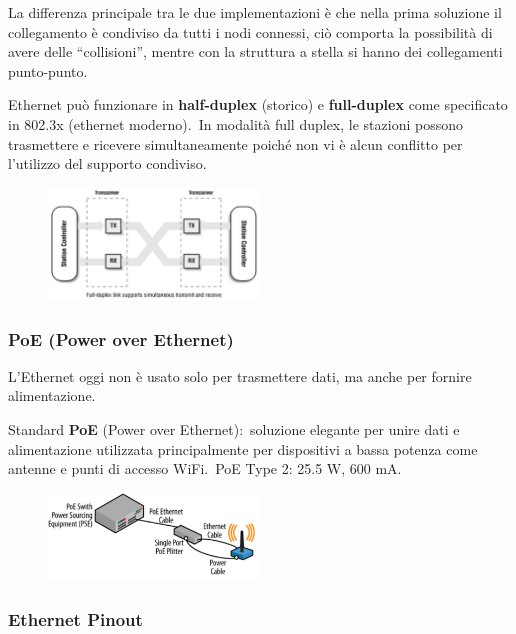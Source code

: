 \noindent La differenza principale tra le due implementazioni è che nella prima soluzione il collegamento è condiviso da tutti i nodi connessi, ciò comporta la possibilità di avere delle ``collisioni'', mentre con la struttura a stella si hanno dei collegamenti punto-punto.\

Ethernet può funzionare in \textbf{half-duplex} (storico) e \textbf{full-duplex} come specificato in 802.3x (ethernet moderno).\
In modalità full duplex, le stazioni possono trasmettere e ricevere simultaneamente poiché non vi è alcun conflitto per l'utilizzo del supporto condiviso.

\begin{figure}[H]
    \centering
    \includegraphics[width=0.5\textwidth]{immagini/FullDuplex.png}
\end{figure}

\subsubsection{PoE (Power over Ethernet)}

L'Ethernet oggi non è usato solo per trasmettere dati, ma anche per fornire alimentazione.\

Standard \textbf{PoE} (Power over Ethernet):\ soluzione elegante per unire dati e alimentazione utilizzata principalmente per dispositivi a bassa potenza come antenne e punti di accesso WiFi.\
PoE Type 2: 25.5 W, 600 mA.

\begin{figure}[H]
    \centering
    \includegraphics[width=0.5\textwidth]{immagini/PoE.png}
\end{figure}

\subsubsection{Ethernet Pinout}

